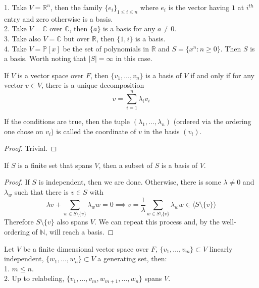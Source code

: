 \begin{example}
    1. Take $V=\mathbb R^n$, then the family $\{e_i\}_{1\le i\le n}$ where $e_i$ is the vector having $1$ at $i^{th}$ entry and zero otherwise is a basis.\\
    2. Take $V=\mathbb C$ over $\mathbb C$, then $\{a\}$ is a basis for any $a\neq 0$.\\
    3. Take also $V=\mathbb C$ but over $\mathbb R$, then $\{1,i\}$ is a basis.\\
    4. Take $V=\mathbb P[x]$ be the set of polynomials in $\mathbb R$ and $S=\{x^n:n\ge 0\}$.
    Then $S$ is a basis.
    Worth noting that $|S|=\infty$ in this case.
\end{example}
\begin{lemma}
    If $V$ is a vector space over $F$, then $\{v_1,\ldots,v_n\}$ is a basis of $V$ if and only if for any vector $v\in V$, there is a unique decomposition
    $$v=\sum_{i=1}^n\lambda_iv_i$$
\end{lemma}
\begin{remark}
    If the conditions are true, then the tuple $(\lambda_1,\ldots,\lambda_n)$ (ordered via the ordering one chose on $v_i$) is called the coordinate of $v$ in the basis $(v_i)$.
\end{remark}
\begin{proof}
    Trivial.
\end{proof}
\begin{lemma}
    If $S$ is a finite set that spans $V$, then a subset of $S$ is a basis of $V$.
\end{lemma}
\begin{proof}
    If $S$ is independent, then we are done.
    Otherwise, there is some $\lambda\neq 0$ and $\lambda_w$ such that there is $v\in S$ with
    $$\lambda v+\sum_{w\in S\setminus\{v\}}\lambda_ww=0\implies v=\frac{1}{\lambda}\sum_{w\in S\setminus\{v\}}\lambda_ww\in\langle S\setminus\{v\}\rangle$$
    Therefore $S\setminus\{v\}$ also spans $V$.
    We can repeat this process and, by the well-ordering of $\mathbb N$, will reach a basis.
\end{proof}
\begin{theorem}\label{steinitz}
    Let $V$ be a finite dimensional vector space over $F$, $\{v_1,\ldots,v_m\}\subset V$ linearly independent, $\{w_1,\ldots,w_n\}\subset V$ a generating set, then:\\
    1. $m\le n$.\\
    2. Up to relabeling, $\{v_1,\ldots,v_m,w_{m+1},\ldots,w_n\}$ spans $V$.
\end{theorem}
